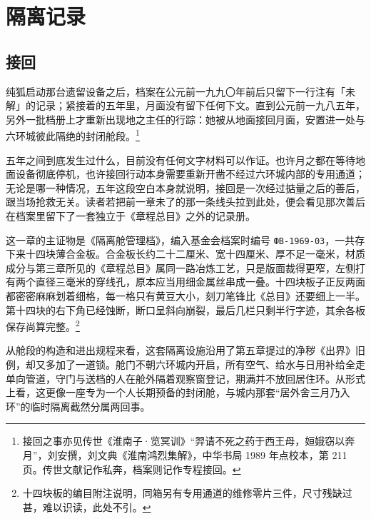 \chapter{隔离记录}


\section{接回}

纯狐启动那台遗留设备之后，档案在公元前一九九〇年前后只留下一行注有「未解」的记录；紧接着的五年里，月面没有留下任何下文。直到公元前一九八五年，另外一批档册上才重新出现地之主任的行踪：她被从地面接回月面，安置进一处与六环城彼此隔绝的封闭舱段。\footnote{接回之事亦见传世《淮南子·览冥训》“羿请不死之药于西王母，姮娥窃以奔月”，刘安撰，刘文典《淮南鸿烈集解》，中华书局 1989 年点校本，第 211 页。传世文献记作私奔，档案则记作专程接回。}

五年之间到底发生过什么，目前没有任何文字材料可以作证。也许月之都在等待地面设备彻底停机，也许接回行动本身需要重新开凿不经过六环城内部的专用通道；无论是哪一种情况，五年这段空白本身就说明，接回是一次经过掂量之后的善后，跟当场抢救无关。读者若把前一章未了的那一条线头拉到此处，便会看见那次善后在档案里留下了一套独立于《章程总目》之外的记录册。

这一章的主证物是《隔离舱管理档》，编入基金会档案时编号 \texttt{ФВ-1969-03}，一共存下来十四块薄合金板。合金板长约二十二厘米、宽十四厘米、厚不足一毫米，材质成分与第三章所见的《章程总目》属同一路冶炼工艺，只是版面裁得更窄，左侧打有两个直径三毫米的穿线孔，原本应当用细金属丝串成一叠。十四块板子正反两面都密密麻麻划着细格，每一格只有黄豆大小，刻刀笔锋比《总目》还要细上一半。第十四块的右下角已经蚀断，断口呈斜向崩裂，最后几栏只剩半行字迹，其余各板保存尚算完整。\footnote{十四块板的编目附注说明，同箱另有专用通道的维修零片三件，尺寸残缺过甚，难以识读，此处不引。}

从舱段的构造和进出规程来看，这套隔离设施沿用了第五章提过的净秽《出界》旧例，却又多加了一道锁。舱门不朝六环城内开启，所有空气、给水与日用补给全走单向管道，守门与送档的人在舱外隔着观察窗登记，期满并不放回居住环。从形式上看，这更像一座专为一个人长期预备的封闭舱，与城内那套“居外舍三月乃入环”的临时隔离截然分属两回事。

